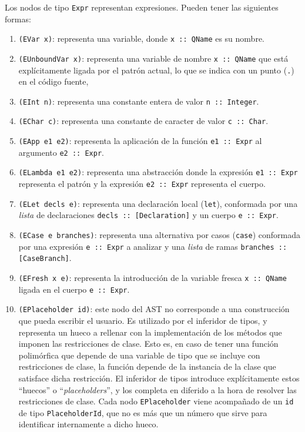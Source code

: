 Los nodos de tipo \verb|Expr| representan expresiones.
Pueden tener las siguientes formas:
\begin{enumerate}

  \item \verb|(EVar x)|: representa una variable, donde \verb|x :: QName| es su nombre.

  \item \verb|(EUnboundVar x)|:
    representa una variable de nombre \verb|x :: QName|
    que está explícitamente ligada por el patrón
    actual, lo que se indica con un punto (\verb|.|) en el código fuente,
  
  \item \verb|(EInt n)|: representa una constante entera de valor \verb|n :: Integer|.

  \item \verb|(EChar c)|: representa una constante de caracter de valor \verb|c :: Char|.

  \item \verb|(EApp e1 e2)|: representa la aplicación de la función \verb|e1 :: Expr| al argumento \verb|e2 :: Expr|.

  \item \verb|(ELambda e1 e2)|: representa una abstracción donde
  la expresión \verb|e1 :: Expr| representa el patrón
  y la expresión \verb|e2 :: Expr| representa el cuerpo.
  
  \item \verb|(ELet decls e)|: representa una declaración local (\verb|let|),
  conformada por una {\em lista} de declaraciones \verb|decls :: [Declaration]|
  y un cuerpo \verb|e :: Expr|.
  
  \item \verb|(ECase e branches)|: representa una alternativa por casos (\verb|case|)
  conformada por una expresión \verb|e :: Expr| a analizar
  y una {\em lista} de ramas \texttt{branches :: [CaseBranch]}.
  
  \item \verb|(EFresh x e)|: representa la introducción de la variable fresca \verb|x :: QName|
  ligada en el cuerpo \verb|e :: Expr|.
  
  \item \verb|(EPlaceholder id)|:
  este nodo del AST no corresponde a una construcción que pueda escribir el usuario.
  Es utilizado por el inferidor de tipos, y representa un hueco a rellenar
  con la implementación de los métodos que imponen las restricciones de clase.
  Esto es, en caso de tener una función polimórfica que
  depende de una variable de tipo
  que se incluye con restricciones de clase,
  la función depende de la instancia de la clase que satisface dicha restricción.
  El inferidor de tipos introduce explícitamente estos ``huecos'' o ``{\em placeholders}'',
  y los completa en diferido a la hora de resolver las restricciones de clase.
  Cada nodo \verb|EPlaceholder| viene acompañado de un \verb|id|
  de tipo \verb|PlaceholderId|, que no es más que un número que sirve
  para identificar internamente a dicho hueco.
\end{enumerate}

